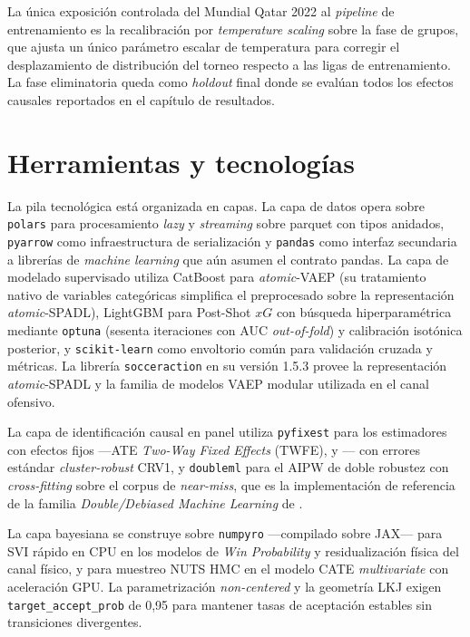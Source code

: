 La única exposición controlada del Mundial Qatar 2022 al
\textit{pipeline} de entrenamiento es la recalibración por
\textit{temperature scaling} sobre la fase de grupos, que ajusta un
único parámetro escalar de temperatura para corregir el desplazamiento
de distribución del torneo respecto a las ligas de entrenamiento. La
fase eliminatoria queda como \textit{holdout} final donde se evalúan
todos los efectos causales reportados en el capítulo de resultados.


\section{Herramientas y tecnologías}
\label{sec:herramientas}

La pila tecnológica está organizada en capas. La capa de datos opera
sobre \texttt{polars} para procesamiento \textit{lazy} y
\textit{streaming} sobre parquet con tipos anidados, \texttt{pyarrow}
como infraestructura de serialización y \texttt{pandas} como
interfaz secundaria a librerías de \textit{machine learning} que aún
asumen el contrato pandas. La capa de modelado supervisado utiliza
CatBoost para \textit{atomic}-VAEP (su tratamiento nativo de variables
categóricas simplifica el preprocesado sobre la representación
\textit{atomic}-SPADL), LightGBM para Post-Shot $xG$ con búsqueda
hiperparamétrica mediante \texttt{optuna} (sesenta iteraciones con
AUC \textit{out-of-fold}) y calibración isotónica posterior, y
\texttt{scikit-learn} como envoltorio común para validación cruzada
y métricas. La librería \texttt{socceraction} en su versión 1.5.3
provee la representación \textit{atomic}-SPADL y la familia de
modelos VAEP modular utilizada en el canal ofensivo.

La capa de identificación causal en panel utiliza \texttt{pyfixest}
para los estimadores con efectos fijos ---ATE \textit{Two-Way Fixed
Effects} (TWFE), \citeauthor{SunAbraham2021} y
\citeauthor{BorusyakJaravelSpiess2024}--- con errores estándar
\textit{cluster-robust} CRV1, y \texttt{doubleml} para el AIPW de
doble robustez con \textit{cross-fitting} sobre el corpus de
\textit{near-miss}, que es la implementación de referencia de la
familia \textit{Double/Debiased Machine Learning} de
\textcite{Chernozhukov2018DML}.

La capa bayesiana se construye sobre \texttt{numpyro} ---compilado
sobre JAX--- para SVI rápido en CPU en los modelos de
\textit{Win Probability} y residualización física del canal físico,
y para muestreo NUTS HMC en el modelo CATE \textit{multivariate} con
aceleración GPU. La parametrización \textit{non-centered} y la
geometría LKJ exigen \texttt{target\_accept\_prob} de 0{,}95 para
mantener tasas de aceptación estables sin transiciones divergentes.

